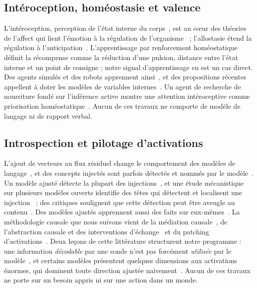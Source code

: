 \documentclass[11pt,a4paper]{article}
\begin{document}
\subsection{Intéroception, homéostasie et valence}

L'intéroception, perception de l'état interne du corps~\cite{craig2002}, est au
cœur des théories de l'affect qui lient l'émotion à la régulation de
l'organisme~\cite{damasio1999,damasio2010,seth2013,barrett2015} ; l'allostasie
étend la régulation à l'anticipation~\cite{sterling2012}. L'apprentissage par
renforcement homéostatique~\cite{keramati2014} définit la récompense comme la
réduction d'une pulsion, distance entre l'état interne et un point de consigne ;
notre signal d'apprentissage en est un cas direct. Des agents simulés et des
robots apprennent ainsi~\cite{yoshida2024}, et des propositions récentes appellent
à doter les modèles de variables internes~\cite{lee2023interoceptive,man2019}.
Un agent de recherche de nourriture fondé sur l'inférence active montre une
attention intéroceptive comme priorisation homéostatique~\cite{interoceptive2026}.
Aucun de ces travaux ne comporte de modèle de langage ni de rapport verbal.

\subsection{Introspection et pilotage d'activations}

L'ajout de vecteurs au flux résiduel change le comportement des modèles de
langage~\cite{turner2023,zou2023,li2023iti}, et des concepts injectés
sont parfois détectés et nommés par le modèle~\cite{lindsey2025}. Un modèle
ajusté détecte la plupart des injections~\cite{rivera2025}, et une étude
mécanistique sur plusieurs modèles ouverts identifie des têtes qui détectent et
localisent une injection~\cite{introspectionmech2026} ; des critiques soulignent
que cette détection peut être aveugle au contenu~\cite{realitycheck2026,disturbance2025}.
Des modèles ajustés apprennent aussi des faits sur eux-mêmes~\cite{binder2024}.
La méthodologie causale que nous suivons vient de la médiation
causale~\cite{vig2020,meng2022}, de l'abstraction causale et des interventions
d'échange~\cite{geiger2021} et du patching d'activations~\cite{heimersheim2024}.
Deux leçons de cette littérature structurent notre programme : une information
\emph{décodable} par une sonde n'est pas forcément \emph{utilisée} par le
modèle~\cite{hewitt2019,elazar2021,belinkov2022}, et certains modèles
présentent quelques dimensions aux activations énormes, qui dominent toute
direction ajustée naïvement~\cite{sun2024massive}. Aucun de ces travaux ne porte
sur un besoin appris ni sur une action dans un monde.
\end{document}
